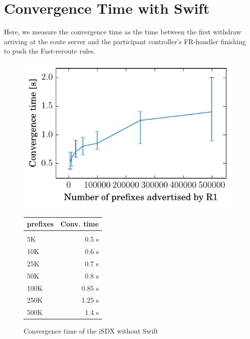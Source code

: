 \section{\label{chapter5:Convergence time with Swift}Convergence Time with Swift}

Here, we measure the convergence time as the time between the first withdraw arriving at the route server and the participant controller's FR-handler finishing to push the Fast-reroute rules.

\begin{figure}[h]
\centering
\begin{minipage}[t]{.4\textwidth}
\centering
\vspace{0pt}
\includegraphics[scale = 1]{Figures/swift.pdf}
\end{minipage}\hfill
\begin{minipage}[t]{.4\textwidth}
\centering
\vspace{0pt}
\begin{tabular}{@{}lr@{}}
	\\
	prefixes & Conv. time \\
	\hline
	\\
    5K & 0.5 s  \\
    10K & 0.6 s   \\
    25K & 0.7 s   \\
    50K & 0.8 s  \\
    100K & 0.85 s \\
    250K & 1.25 s   \\
    500K & 1.4 s  \\
\end{tabular}
\end{minipage}
\caption{Convergence time of the iSDX without Swift}
\label{fig:withswift}
\end{figure}

